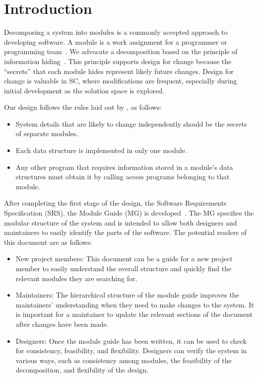 \documentclass[12pt, titlepage]{article}
\begin{document}
\newpage

\tableofcontents

\listoftables

\listoffigures

\newpage


\section{Introduction}

Decomposing a system into modules is a commonly accepted approach to developing
software.  A module is a work assignment for a programmer or programming
team~\citep{ParnasEtAl1984}.  We advocate a decomposition
based on the principle of information hiding~\citep{Parnas1972a}.  This
principle supports design for change because the ``secrets'' that each module
hides represent likely future changes.  Design for change is valuable in SC,
where modifications are frequent, especially during initial development as the
solution space is explored.  

Our design follows the rules laid out by \citet{ParnasEtAl1984}, as follows:
\begin{itemize}
\item System details that are likely to change independently should be the
  secrets of separate modules.
\item Each data structure is implemented in only one module.
\item Any other program that requires information stored in a module's data
  structures must obtain it by calling access programs belonging to that module.
\end{itemize}

After completing the first stage of the design, the Software Requirements
Specification (SRS), the Module Guide (MG) is developed~\citep{ParnasEtAl1984}. The MG
specifies the modular structure of the system and is intended to allow both
designers and maintainers to easily identify the parts of the software.  The
potential readers of this document are as follows:

\begin{itemize}
\item New project members: This document can be a guide for a new project member
  to easily understand the overall structure and quickly find the
  relevant modules they are searching for.
\item Maintainers: The hierarchical structure of the module guide improves the
  maintainers' understanding when they need to make changes to the system. It is
  important for a maintainer to update the relevant sections of the document
  after changes have been made.
\item Designers: Once the module guide has been written, it can be used to
  check for consistency, feasibility, and flexibility. Designers can verify the
  system in various ways, such as consistency among modules, the feasibility of the
  decomposition, and flexibility of the design.
\end{itemize}
\end{document}

